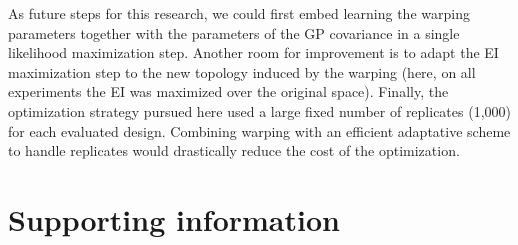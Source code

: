 As future steps for this research, we could first embed learning the warping parameters together with the parameters of the GP covariance 
in a single likelihood maximization step. Another room for improvement is to adapt the EI maximization step to the new topology induced by the warping
(here, on all experiments the EI was maximized over the original space). Finally, the optimization strategy pursued here used a large fixed number of 
replicates (1,000) for each evaluated design. Combining warping with an efficient adaptative scheme to handle replicates \cite{jalali2017comparison} would drastically reduce the cost 
of the optimization.



% 




\section*{Supporting information}

\renewcommand{\figurename}{Supplementary Figure}
\setcounter{figure}{0} 

